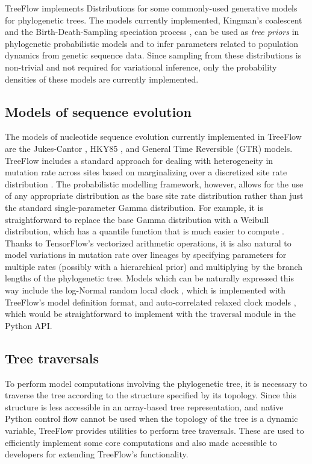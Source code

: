 \documentclass[oupdraft]{sysbio_sse}
\let\cite\citep
\begin{document}
TreeFlow implements Distributions for some commonly-used generative models for phylogenetic trees.
The models currently implemented, Kingman's coalescent \cite{kuhner1995estimating} and the Birth-Death-Sampling speciation process \cite{stadler2009incomplete}, can be used as \textit{tree priors} in phylogenetic probabilistic models and to infer parameters related to population dynamics from genetic sequence data. Since sampling from these distributions is non-trivial and not required for variational inference, only the probability densities of these models are currently implemented.

\subsection{Models of sequence evolution}
\label{evolution}

The models of nucleotide sequence evolution currently implemented in TreeFlow are the Jukes-Cantor \cite{jukes1969evolution}, HKY85 \cite{hasegawa1985dating}, and General Time Reversible (GTR) \cite{tavare1986some} models. TreeFlow includes a standard approach for dealing with heterogeneity in mutation rate across sites based on marginalizing over a discretized site rate distribution \cite{yang1994maximum}. The probabilistic modelling framework, however, allows for the use of any appropriate distribution as the base site rate distribution rather than just the standard single-parameter Gamma distribution. For example, it is straightforward to replace the base Gamma distribution with a Weibull distribution, which has a quantile function that is much easier to compute \cite{fourment2019evaluating}. Thanks to TensorFlow's vectorized arithmetic operations, it is also natural to model variations in mutation rate over lineages by specifying parameters for multiple rates (possibly with a hierarchical prior) and multiplying by the branch lengths of the phylogenetic tree. Models which can be naturally expressed this way include the log-Normal random local clock \cite{drummond2006relaxed}, which is implemented with TreeFlow's model definition format, and auto-correlated relaxed clock models \cite{thorne1998estimating}, which would be straightforward to implement with the traversal module in the Python API.

\subsection{Tree traversals}

To perform model computations involving the phylogenetic tree, it is necessary to traverse the tree according to the structure specified by its topology. Since this structure is less accessible in an array-based tree representation, and native Python control flow cannot be used when the topology of the tree is a dynamic variable, TreeFlow provides utilities to perform tree traversals. These are used to efficiently implement some core computations and also made accessible to developers for extending TreeFlow's functionality.
\end{document}
